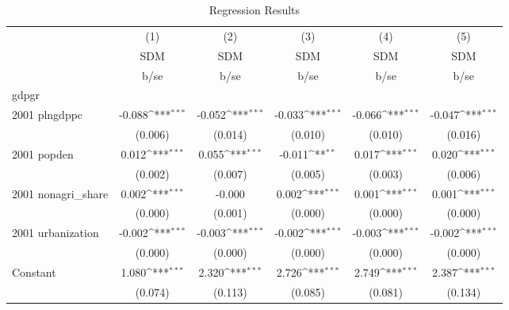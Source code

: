 \begin{table}[htbp]\centering
\def\sym#1{\ifmmode^{#1}\else\(^{#1}\)\fi}
\caption{Regression Results}
\begin{tabular}{l*{5}{c}}
\hline\hline
                    &\multicolumn{1}{c}{(1)}&\multicolumn{1}{c}{(2)}&\multicolumn{1}{c}{(3)}&\multicolumn{1}{c}{(4)}&\multicolumn{1}{c}{(5)}\\
                    &\multicolumn{1}{c}{SDM}&\multicolumn{1}{c}{SDM}&\multicolumn{1}{c}{SDM}&\multicolumn{1}{c}{SDM}&\multicolumn{1}{c}{SDM}\\
                    &        b/se         &        b/se         &        b/se         &        b/se         &        b/se         \\
\hline
gdpgr               &                     &                     &                     &                     &                     \\
2001 plngdppc       &      -0.088\sym{***}&      -0.052\sym{***}&      -0.033\sym{***}&      -0.066\sym{***}&      -0.047\sym{***}\\
                    &     (0.006)         &     (0.014)         &     (0.010)         &     (0.010)         &     (0.016)         \\
2001 popden         &       0.012\sym{***}&       0.055\sym{***}&      -0.011\sym{**} &       0.017\sym{***}&       0.020\sym{***}\\
                    &     (0.002)         &     (0.007)         &     (0.005)         &     (0.003)         &     (0.006)         \\
2001 nonagri\_share  &       0.002\sym{***}&      -0.000         &       0.002\sym{***}&       0.001\sym{***}&       0.001\sym{***}\\
                    &     (0.000)         &     (0.001)         &     (0.000)         &     (0.000)         &     (0.000)         \\
2001 urbanization   &      -0.002\sym{***}&      -0.003\sym{***}&      -0.002\sym{***}&      -0.003\sym{***}&      -0.002\sym{***}\\
                    &     (0.000)         &     (0.000)         &     (0.000)         &     (0.000)         &     (0.000)         \\
Constant            &       1.080\sym{***}&       2.320\sym{***}&       2.726\sym{***}&       2.749\sym{***}&       2.387\sym{***}\\
                    &     (0.074)         &     (0.113)         &     (0.085)         &     (0.081)         &     (0.134)         \\

\end{tabular}
\end{table}
